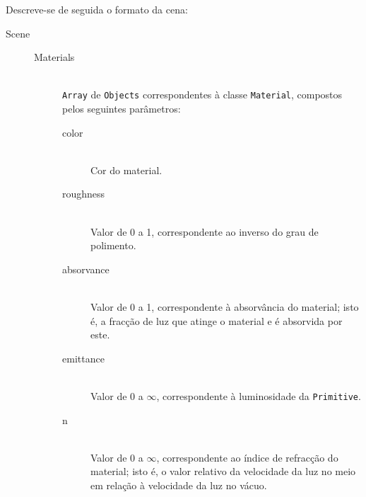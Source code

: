 \documentclass[a4paper]{article}
\begin{document}
\indent Descreve-se de seguida o formato da cena:
\begin{description}
	\item[Scene] \hfill
		\begin{description}
			\item[Materials] \hfill \\
				\texttt{Array} de \texttt{Objects} correspondentes à classe \texttt{Material}, compostos pelos seguintes parâmetros:
				\begin{description}
					\item[color] \hfill \\
						Cor do material.
					\item[roughness] \hfill \\
						Valor de 0 a 1, correspondente ao inverso do grau de polimento.
					\item[absorvance] \hfill \\
						Valor de 0 a 1, correspondente à absorvância do material; isto é, a fracção de luz que atinge o material e é absorvida por este.
					\item[emittance] \hfill \\
						Valor de 0 a $\infty$, correspondente à luminosidade da \texttt{Primitive}.
					\item[n] \hfill \\
						Valor de 0 a $\infty$, correspondente ao índice de refracção do material; isto é, o valor relativo da velocidade da luz no meio em relação
						à velocidade da luz no vácuo.
				\end{description}


\end{description}
\end{description}
\end{document}
